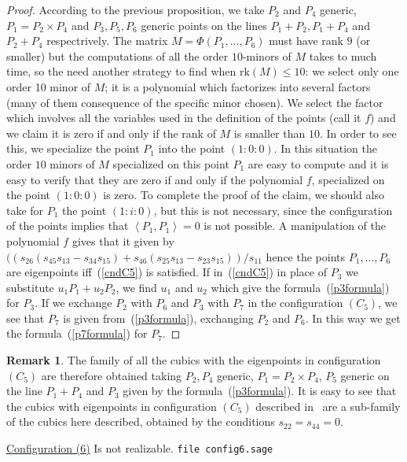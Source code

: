 \documentclass{amsart}
\theoremstyle{plain}
\theoremstyle{definition}
\newtheorem{rmk}[lemma]{Remark}
\newcommand{\scl}[2]{\left\langle {#1}, {#2} \right\rangle}
\newcommand{\rk}{\ensuremath{\mathrm{rk}}}
\begin{document}
\begin{proof}
According to the previous proposition, we take $P_2$ and $P_4$ generic, 
$P_1 = P_2 \times P_4$ and $P_3, P_5, P_6$ generic points on the lines
$P_1+P_2, P_1+P_4$ and $P_2+P_4$ respectrively. The matrix
$M = \Phi(P_1, \dots, P_6)$ must have rank $9$ (or smaller) but the computations
of all the order $10$-minors of $M$ takes to much time, so the need another
strategy to find when $\rk (M) \leq 10$: we select
only one order 10 minor of $M$; it is a polynomial which
factorizes into
several factors (many of them consequence of the specific minor chosen).
We select the factor which involves all the variables used in the definition
of the points (call it $f$) and we claim it is zero if and only if the
rank of $M$
is smaller than $10$. In order to see this, we specialize the point $P_1$
into the point $(1:0:0)$. In this situation the order $10$ minors of $M$
specialized on this point $P_1$ are easy to compute and it is easy to
verify that they are zero if and only if the polynomial $f$, specialized
on the point $(1:0:0)$ is zero. To complete the proof of the claim, we should
also take for $P_1$ the point $(1:i:0)$, but this is not necessary, since
the configuration of the points implies that $\scl{P_1}{P_1}=0$ is not
possible. A manipulation of the polynomial $f$ gives that it given by
$((s_{26}(s_{45}s_{13}-s_{34}s_{15})+s_{46}(s_{25}s_{13}-s_{23}s_{15}))/s_{11}$
hence the points $P_1, \dots, P_6$ are eigenpoints iff~(\ref{cndC5}) is
satisfied. If in~(\ref{cndC5}) in place of $P_3$ we substitute $u_1P_1+u_2P_2$,
we find $u_1$ and $u_2$ which give the formula~(\ref{p3formula}) for $P_3$.
If we exchange $P_2$ with $P_6$ and $P_3$ with $P_7$ in the configuration
$(C_5)$, we see that $P_7$ is given from~(\ref{p3formula}), exchanging
$P_2$ and $P_6$. In this way we get the formula~(\ref{p7formula}) for
$P_7$.
\end{proof}
\begin{rmk}
The family of all the cubics with the eigenpoints in configuration $(C_5)$
are therefore obtained taking $P_2, P_4$ generic, $P_1 = P_2 \times P_4$,
$P_5$ generic on the line $P_1+P_4$ and $P_3$ given by the
formula~(\ref{p3formula}).
It is easy to see that the cubics with eigenpoints in configuration $(C_5)$
described in~ are a sub-family of the cubics here described,
obtained by the conditions $s_{22} = s_{44} = 0$.
\end{rmk}


\underline{Configuration (6)} Is not realizable.
\verb+file config6.sage+
\end{document}
